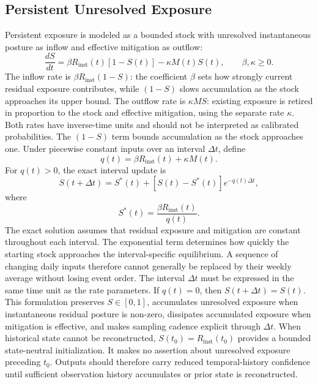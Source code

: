 \documentclass[11pt]{article}
\begin{document}
\subsection{Persistent Unresolved Exposure}
Persistent exposure is modeled as a bounded stock with unresolved instantaneous posture
as inflow and effective mitigation as outflow:
\begin{equation}
  \frac{dS}{dt}
  =\beta R_{\mathrm{inst}}(t)\left[1-S(t)\right]
  -\kappa M(t)S(t),
  \qquad \beta,\kappa\geq0.
  \label{eq:stock-ode}
\end{equation}
The inflow rate is $\beta R_{\mathrm{inst}}(1-S)$:
the coefficient $\beta$ sets how strongly current residual exposure
contributes, while $(1-S)$ slows accumulation as the stock approaches
its upper bound. The outflow rate is $\kappa MS$: existing exposure
is retired in proportion to the stock and effective mitigation,
using the separate rate $\kappa$. Both rates have inverse-time units
and should not be interpreted as calibrated probabilities.
The $(1-S)$ term bounds accumulation as the stock approaches one. Under piecewise
constant inputs over an interval $\Delta t$, define
\begin{equation}
  q(t)=\beta R_{\mathrm{inst}}(t)+\kappa M(t).
\end{equation}
For $q(t)>0$, the exact interval update is
\begin{equation}
  S(t+\Delta t)=S^*(t)+\left[S(t)-S^*(t)\right]e^{-q(t)\Delta t},
  \label{eq:stock-discrete}
\end{equation}
where
\begin{equation}
  S^*(t)=\frac{\beta R_{\mathrm{inst}}(t)}{q(t)}.
\end{equation}
The exact solution assumes that residual exposure and mitigation
are constant throughout each interval. The exponential term
determines how quickly the starting stock approaches the
interval-specific equilibrium. A sequence of changing daily
inputs therefore cannot generally be replaced by their weekly
average without losing event order. The interval $\Delta t$
must be expressed in the same time unit as the rate parameters.
If $q(t)=0$, then $S(t+\Delta t)=S(t)$. This formulation preserves $S\in[0,1]$,
accumulates unresolved exposure when instantaneous residual posture is non-zero,
dissipates accumulated exposure when mitigation is effective, and makes sampling
cadence explicit through $\Delta t$. When historical state cannot be reconstructed,
$S(t_0)=R_{\mathrm{inst}}(t_0)$ provides a bounded state-neutral initialization. It
makes no assertion about unresolved exposure preceding $t_0$. Outputs should therefore
carry reduced temporal-history confidence until sufficient observation history
accumulates or prior state is reconstructed.
\end{document}
